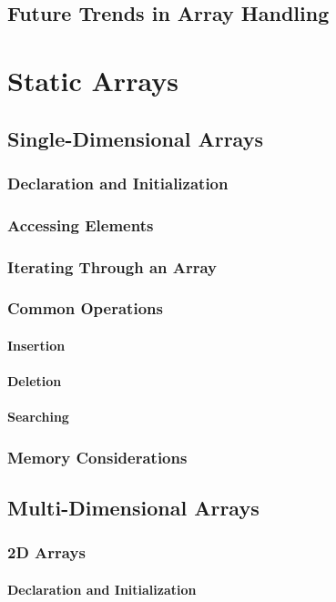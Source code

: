 \documentclass[12pt, oneside]{book}
\begin{document}
\section{Future Trends in Array Handling}


\chapter{Static Arrays}
	\section{Single-Dimensional Arrays}
	\subsection{Declaration and Initialization}
	\subsection{Accessing Elements}
	\subsection{Iterating Through an Array}
	\subsection{Common Operations}
	\subsubsection{Insertion}
	\subsubsection{Deletion}
	\subsubsection{Searching}
	\subsection{Memory Considerations}
	
	\section{Multi-Dimensional Arrays}
	\subsection{2D Arrays}
	\subsubsection{Declaration and Initialization}
\end{document}
